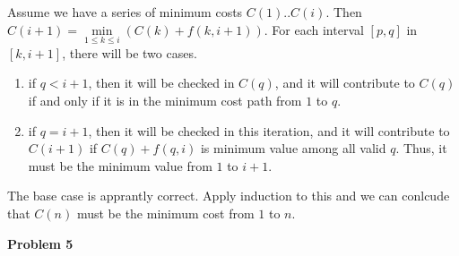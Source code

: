 \documentclass[12pt,letterpaper]{article}
\def\pp{\par\noindent}
\newcommand{\problem}[1]{ \bigskip \pp \textbf{Problem #1}\par}
\begin{document}
Assume we have a series of minimum costs $C(1)..C(i)$. Then $C(i+1)=\underset{1\leq k\leq i}{\min}(C(k)+f(k,i+1))$. For each interval $[p,q]$ in $[k,i+1]$, there will be two cases.
\begin{enumerate}
	\item if $q<i+1$, then it will be checked in $C(q)$, and it will contribute to $C(q)$ if and only if it is in the minimum cost path from $1$ to $q$.\\
	\item if $q=i+1$, then it will be checked in this iteration, and it will contribute to $C(i+1)$ if $C(q)+f(q,i)$ is minimum value among all valid $q$. Thus, it must be the minimum value from $1$ to $i+1$.\\
\end{enumerate}
The base case is apprantly correct. Apply induction to this and we can conlcude that $C(n)$ must be the minimum cost from $1$ to $n$.

\problem{5}
\end{document}
